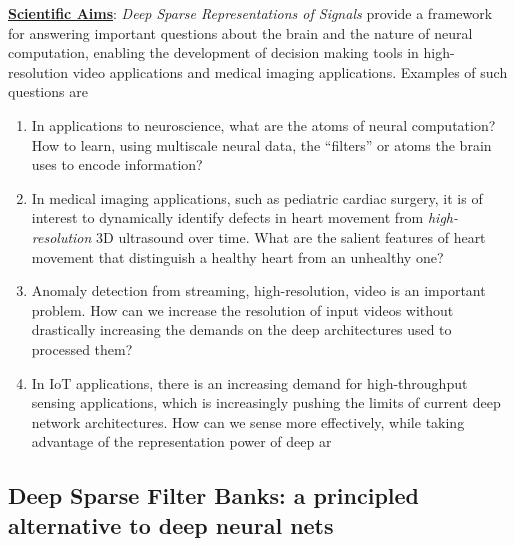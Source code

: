 \documentclass[12pt]{article}
\begin{document}
\noindent \textbf{\underline{Scientific Aims}}: \emph{Deep Sparse Representations of Signals} provide a framework for answering important questions about the brain and the nature of neural computation, enabling the development of decision making tools in high-resolution video applications and medical imaging applications. Examples of such questions are
\begin{enumerate}
	\item In applications to neuroscience, what are the atoms of neural computation? How to learn, using multiscale neural data, the ``filters'' or atoms the brain uses to encode information?
	\item In medical imaging applications, such as pediatric cardiac surgery, it is of interest to dynamically identify defects in heart movement from \emph{high-resolution} 3D ultrasound over time. What are the salient features of heart movement that distinguish a healthy heart from an unhealthy one? 
	\item Anomaly detection from streaming, high-resolution, video is an important problem. How can we increase the resolution of input videos without drastically increasing the demands on the deep architectures used to processed them?	
	\item In IoT applications, there is an increasing demand for high-throughput sensing applications, which is increasingly pushing the limits of current deep network architectures. How can we sense more effectively, while taking advantage of the representation power of deep ar
\end{enumerate}

\subsection*{Deep Sparse Filter Banks: a principled alternative to deep neural nets}
\end{document}
